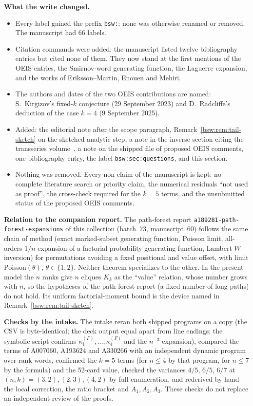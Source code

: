 \documentclass[11pt,letterpaper]{article}
\theoremstyle{definition}
\theoremstyle{remark}
\begin{document}
\textbf{What the write changed.}
\begin{itemize}[leftmargin=2em]
\item Every label gained the prefix \texttt{bsw:}; none was otherwise renamed
 or removed.  The manuscript had 66 labels.
\item Citation commands were added: the manuscript listed twelve
 bibliography entries but cited none of them.  They now stand at the first
 mentions of the OEIS entries, the Smirnov-word generating function, the
 Laguerre expansion, and the works of Eriksson--Martin, Enouen and Mehiri.
\item The authors and dates of the two OEIS contributions are named:
 S.~Kirgizov's fixed-$k$ conjecture (29 September 2023) and D.~Radcliffe's
 deduction of the case $k=4$ (9 September 2025).
\item Added: the editorial note after the scope paragraph,
 Remark~\ref{bsw:rem:tail-sketch} on the sketched analytic step, a note in
 the inverse section citing the transseries volume~\cite{tai}, a note on the
 shipped file of proposed OEIS comments, one
 bibliography entry, the label \texttt{bsw:sec:questions}, and this section.
\item Nothing was removed.  Every non-claim of the manuscript is kept: no
 complete literature search or priority claim, the numerical residuals ``not
 used as proof'', the cross-check required for the $k=5$ terms, and the
 unsubmitted status of the proposed OEIS comments.
\end{itemize}

\textbf{Relation to the companion report.}  The path-forest report
\texttt{a189281-path-forest-expansions} of this collection (batch~73,
manuscript~60) follows the same chain of method (exact marked-subset
generating function, Poisson limit, all-orders $1/n$ expansion of a
factorial probability generating function, Lambert-$W$ inversion) for
permutations avoiding a fixed positional and value offset, with limit
Poisson$(\theta)$, $\theta\in\{1,2\}$.  Neither theorem specializes to the
other.  In the present model the $n$ ranks give $n$ cliques $K_k$ as the
``value'' relation, whose number grows with $n$, so the hypotheses of the
path-forest report (a fixed number of long paths) do not hold.  Its uniform
factorial-moment bound is the device named in
Remark~\ref{bsw:rem:tail-sketch}.

\textbf{Checks by the intake.}  The intake reran both shipped programs on a
copy (the CSV is byte-identical; the deck output equal apart from line
endings; the symbolic script confirms $\kappa_1^{(F)},\ldots,\kappa_4^{(F)}$
and the $n^{-3}$ expansion), compared the terms of A007060, A193624 and
A330266 with an independent dynamic program over rank words, confirmed the
$k=5$ terms (for $n\le4$ by that program, for $n\le7$ by the formula) and the
52-card value, checked the variances $4/5$, $6/5$, $6/7$ at
$(n,k)=(3,2),(2,3),(4,2)$ by full enumeration, and rederived by hand the
local correction, the ratio bracket and $A_1,A_2,A_3$.  These checks do not
replace an independent review of the proofs.
\end{document}
